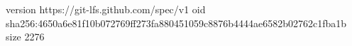version https://git-lfs.github.com/spec/v1
oid sha256:4650a6e81f10b072769ff273fa880451059c8876b4444ae6582b02762c1fba1b
size 2276
